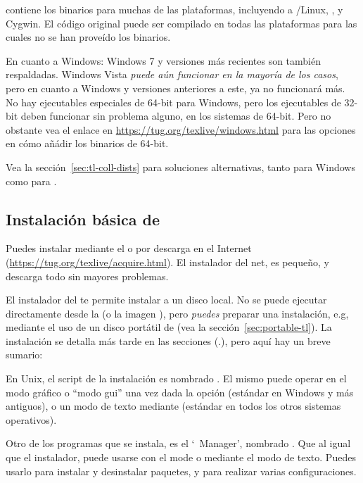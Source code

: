 \documentclass{article}
\begin{document}
\TL{} contiene los binarios para muchas de las plataformas, incluyendo
a \GNU/Linux, \MacOSX, y Cygwin. El código original puede ser
compilado en todas las plataformas para las cuales no se han proveído
los binarios.

En cuanto a Windows: Windows 7 y versiones más recientes son también
respaldadas. Windows Vista \emph{puede aún funcionar en la mayoría de
los casos}, pero en cuanto a Windows  y versiones anteriores
a este, \TL{} ya no funcionará más. No hay ejecutables especiales de
64-bit para Windows, pero los ejecutables de 32-bit deben funcionar
sin problema alguno, en los sistemas de 64-bit. Pero no obstante
vea el enlace en \url{https://tug.org/texlive/windows.html} para las
opciones en cómo añádir los binarios de 64-bit.

Vea la sección~\ref{sec:tl-coll-dists} para soluciones alternativas,
tanto para Windows como para \MacOSX.

\subsection{Instalación básica de \protect\TL{}}
\label{sec:basic}

Puedes instalar \TL{} mediante el \DVD{} o por descarga en el Internet
(\url{https://tug.org/texlive/acquire.html}). El instalador del net, es
pequeño, y descarga todo sin mayores problemas. 

El instalador del \DVD{} te permite instalar a un disco local. No se
puede ejecutar directamente \TL{} desde la \TK{} \DVD{} (o la
imagen ), pero \emph{puedes} preparar una instalación, e.g,
mediante el uso de un disco portátil de \USB{} (vea la
sección~\ref{sec:portable-tl}). La instalación se detalla más tarde en
las secciones (\p.\pageref{sec:install}), pero aquí hay un breve
sumario:

\begin{itemize*}

\item En Unix, el script de la instalación es nombrado
.
	El mismo puede operar en el modo gráfico o ``modo gui'' una
	vez dada la opción  (estándar en Windows y \MacOSX
	más antiguos), o un modo de texto mediante 
	(estándar en todos los otros sistemas operativos).

\item Otro de los programas que se instala, es el `\TL\ Manager', nombrado
	. Que al igual que el instalador, puede usarse con el mode
	\GUI{} o mediante el modo de texto. Puedes usarlo para instalar
	y desinstalar paquetes, y para realizar varias configuraciones.

\end{itemize*}
\end{document}
